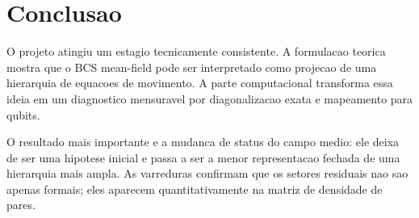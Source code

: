 \documentclass[11pt,a4paper]{article}
\begin{document}
\section{Conclusao}

O projeto atingiu um estagio tecnicamente consistente. A formulacao teorica mostra que o BCS mean-field pode ser interpretado como projecao de uma hierarquia de equacoes de movimento. A parte computacional transforma essa ideia em um diagnostico mensuravel por diagonalizacao exata e mapeamento para qubits.

O resultado mais importante e a mudanca de status do campo medio: ele deixa de ser uma hipotese inicial e passa a ser a menor representacao fechada de uma hierarquia mais ampla. As varreduras confirmam que os setores residuais nao sao apenas formais; eles aparecem quantitativamente na matriz de densidade de pares.
\end{document}
